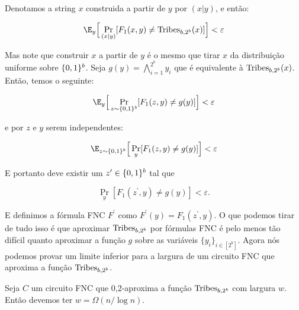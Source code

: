 Denotamos a string $x$ construida a partir de $y$ por $(x \lvert y)$, e então:

\begin{equation*}
	\E_{y}\Big[\Pr_{(x \lvert y)}[F_{1}(x, y) \neq \Tribes_{b, 2^{b}}(x)]\Big] < \varepsilon
\end{equation*}

Mas note que construir $x$ a partir de $y$ é o mesmo que tirar $x$ da distribuição uniforme sobre $\{0, 1\}^{b}$. Seja $g(y) = \bigwedge_{i = 1}^{2^{b}}y_{i}$ que é equivalente à $\text{Tribes}_{b, 2^{b}}(x)$. Então, temos o seguinte:

\begin{equation*}
	\E_{y}\Big[ \Pr_{z \sim \binalph^{b}}[F_{1}(z, y) \neq g(y)]\Big] < \varepsilon
\end{equation*}

e por $z$ e $y$ serem independentes:

\begin{equation*}
	\E_{z \sim \binalph^{b}}\Big[\Pr_{y}[F_{1}(z, y) \neq g(y)]\Big] < \varepsilon
\end{equation*}

E portanto deve existir um $z^{\prime} \in \{0, 1\}^{b}$ tal que

\begin{equation*}
	\Pr_{y}[F_{1}(z^{\prime}, y) \neq g(y)] < \varepsilon.
\end{equation*}

E definimos a fórmula FNC $F^{\prime}$ como $F^{\prime}(y) = F_{1}(z^{\prime}, y)$. O que podemos tirar de tudo isso é que aproximar $\text{Tribes}_{b, 2^{b}}$ por fórmulas FNC é pelo menos tão difícil quanto aproximar a função $g$ sobre as variáveis $\{y_{i}\}_{i \in [2^{b}]}$. Agora nós podemos provar um limite inferior para a largura de um circuito FNC que aproxima a função $\text{Tribes}_{b, 2^{b}}$.

\begin{teo} \label{tribes_width_lb}

Seja $C$ um circuito FNC que 0,2-aproxima a função $\text{Tribes}_{b, 2^{b}}$ com largura $w$. Então devemos ter $w = \Omega(n/\log n)$.

\end{teo}